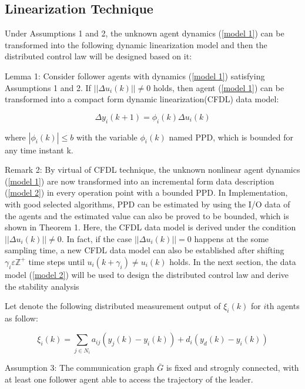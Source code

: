 \documentclass[journal,onecolumn]{IEEEtran}
\begin{document}
\subsection{Linearization Technique}

Under Assumptions 1 and 2, the unknown agent dynamics (\ref{model 1}) can be transformed into the following dynamic linearization model and then the distributed control law will be designed based on it:

Lemma 1: Consider follower agents with dynamics (\ref{model 1}) satisfying Assumptions 1 and 2. If $ ||\Delta u_i(k) || \neq 0 $ holds, then agent (\ref{model 1}) can be transformed into a compact form dynamic linearization(CFDL) data model:


\begin{equation}
    \label{model 2}
    \Delta y_i(k+1)=\phi_i(k)\Delta u_i(k)
\end{equation}

where \( | \phi_i(k) | \leq b\) with the variable \(\phi_i(k)\) named PPD, which is bounded for any time instant k.

Remark 2: By virtual of CFDL technique, the unknown nonlinear agent dynamics (\ref{model 1}) are now transformed into an incremental form data description (\ref{model 2}) in every operation point with a bounded PPD. In Implementation, with good selected algorithms, PPD can be estimated by using the I/O data of the agents and the estimated value can also be proved to be bounded, which is shown in Theorem 1. Here, the CFDL data model is derived under the condition $ ||\Delta u_i(k) || \neq 0 $. In fact, if the case $ ||\Delta u_i(k) || = 0 $ happens at the some sampling time, a new CFDL data model can also be established after shifting $ \gamma_i \varepsilon \mathbb{Z}^+ $  time steps until $ u_i(k+\gamma_i) \neq u_i(k)$ holds. In the next section, the data model (\ref{model 2}) will be used to design the distributed control law and derive the stability analysis
 
Let denote the following distributed measurement output of \(\xi_i(k)\) for $i$th agents as follow:

\begin{equation}
    \label{model 3}
    \xi_i(k) = \sum_{j \in N_i} a_{ij}( y_j(k)-y_i(k)) + d_i(y_d(k) - y_i(k ))
\end{equation}

 

Assumption 3: The communication graph $\bar{G}$ is fixed and strognly connected, with at least one follower agent able to access the trajectory of the leader.
\end{document}
